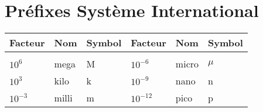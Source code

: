
\section*{Préfixes Système International}
\begin{center}

    \begin{tabular}{lll|lll}
    Facteur    & Nom   & Symbol & Facteur    & Nom   & Symbol \\\hline\\[-1em]
    $10^{6}$   & mega  & M & $10^{-6}$  & micro & $\mu$ \\
    $10^3$     & kilo  & k & $10^{-9}$  & nano  & n     \\
    $10^{-3}$  & milli & m & $10^{-12}$ & pico  & p
    \end{tabular}
\end{center}

